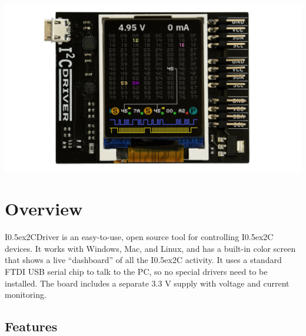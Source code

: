 \documentclass{article}
\newcommand{\two}{\raise0.5ex\hbox{\footnotesize{2}}}
\newcommand{\iic}{I\two{}C}
\newcommand{\iicdriver}{I\two{}CDriver}
\begin{document}
\newpage
\begin{center}
\includegraphics[width=1.00\textwidth]{img/i2cdriver/hero}
\end{center}
\tableofcontents

\newpage

\setlength{\parindent}{0mm}
\setlength{\parskip}{1mm}

\section{Overview}

\iicdriver{} is an easy-to-use, open source tool for controlling \iic{} devices. It works with Windows, Mac, and Linux, and has a built-in color screen that shows a live “dashboard” of all the \iic{} activity. It uses a standard FTDI USB serial chip to talk to the PC, so no special drivers need to be installed. The board includes a separate 3.3 V supply with voltage and current monitoring.

\subsection{Features}
\end{document}

